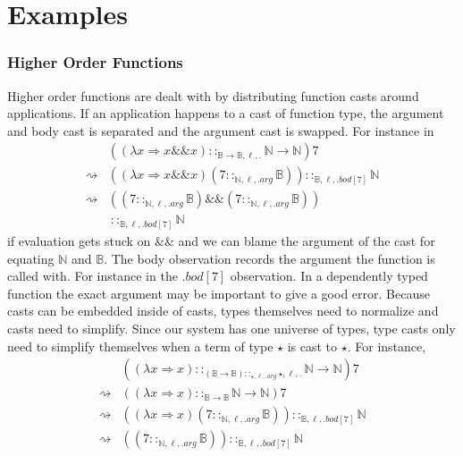 
\section{Examples}


\subsubsection{Higher Order Functions}

Higher order functions are dealt with by distributing function casts
around applications. If an application happens to a cast of function
type, the argument and body cast is separated and the argument cast
is swapped. For instance in 
\begin{align*}
\, & \left(\left(\lambda x\Rightarrow x\&\&x\right)::_{\mathbb{B}\rightarrow\mathbb{B},\ell,.}\mathbb{N}\rightarrow\mathbb{N}\right)7\\
\rightsquigarrow & \left(\left(\lambda x\Rightarrow x\&\&x\right)\left(7::_{\mathbb{N},\ell,.arg}\mathbb{B}\right)\right)::_{\mathbb{B},\ell,.bod[7]}\mathbb{N}\\
\rightsquigarrow & \left(\left(7::_{\mathbb{N},\ell,.arg}\mathbb{B}\right)\&\&\left(7::_{\mathbb{N},\ell,.arg}\mathbb{B}\right)\right)\\
\, & \ ::_{\mathbb{B},\ell,.bod[7]}\mathbb{N}
\end{align*}
if evaluation gets stuck on $\&\&$ and we can blame the argument
of the cast for equating $\mathbb{N}$ and $\mathbb{B}$. The body
observation records the argument the function is called with. For
instance in the $.bod[7]$ observation. In a dependently typed function
the exact argument may be important to give a good error. Because
casts can be embedded inside of casts, types themselves need to normalize
and casts need to simplify. Since our system has one universe of types,
type casts only need to simplify themselves when a term of type $\star$
is cast to $\star$. For instance, 
\begin{align*}
\, & \left(\left(\lambda x\Rightarrow x\right)::_{\left(\mathbb{B}\rightarrow\mathbb{B}\right)::_{\star,\ell,.arg}\star,\ell,.}\mathbb{N}\rightarrow\mathbb{N}\right)7\\
\rightsquigarrow & \left(\left(\lambda x\Rightarrow x\right)::_{\mathbb{B}\rightarrow\mathbb{B}}\mathbb{N}\rightarrow\mathbb{N}\right)7\\
\rightsquigarrow & \left(\left(\lambda x\Rightarrow x\right)\left(7::_{\mathbb{N},\ell,.arg}\mathbb{B}\right)\right)::_{\mathbb{B},\ell,.bod[7]}\mathbb{N}\\
\rightsquigarrow & \left(\left(7::_{\mathbb{N},\ell,.arg}\mathbb{B}\right)\right)::_{\mathbb{B},\ell,.bod[7]}\mathbb{N}
\end{align*}



